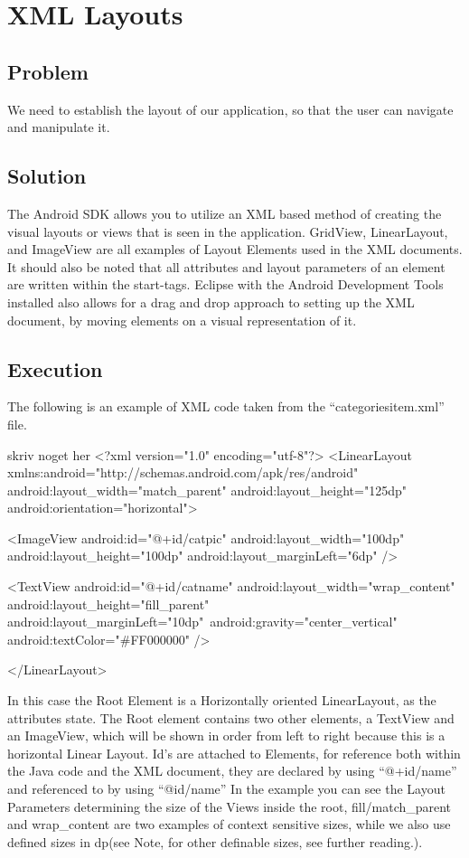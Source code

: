 \section{XML Layouts} %
\subsection*{Problem}
We need to establish the layout of our application, so that the user can navigate and manipulate it.
\subsection*{Solution}
The Android SDK allows you to utilize an XML based method of creating the visual layouts or views that is seen in the application.
GridView, LinearLayout, and ImageView are all examples of Layout Elements used in the XML documents.
It should also be noted that all attributes and layout parameters of an element are written within the start-tags.
Eclipse with the Android Development Tools installed also allows for a drag and drop approach to setting up the XML document, by moving elements on a visual representation of it.

\subsection*{Execution}
The following is an example of XML code taken from the ``categoriesitem.xml'' file.

\begin{xml}{skriv noget her}
<?xml version="1.0" encoding="utf-8"?>
<LinearLayout xmlns:android="http://schemas.android.com/apk/res/android"
    android:layout_width="match_parent"
    android:layout_height="125dp"
    android:orientation="horizontal">

    <ImageView
        android:id="@+id/catpic"
        android:layout_width="100dp"
        android:layout_height="100dp"
        android:layout_marginLeft="6dp" />

    <TextView
        android:id="@+id/catname"
        android:layout_width="wrap_content"
        android:layout_height="fill_parent"
        android:layout_marginLeft="10dp"\
        android:gravity="center_vertical"
        android:textColor="#FF000000" />

</LinearLayout>
\end{xml}

In this case the Root Element is a Horizontally oriented LinearLayout, as the attributes state.
The Root element contains two other elements, a TextView and an ImageView, which will be shown in order from left to right because this is a horizontal Linear Layout.
Id's are attached to Elements, for reference both within the Java code and the XML document, they are declared by using ``@+id/name'' and referenced to by using ``@id/name'' 
In the example you can see the Layout Parameters determining the size of the Views inside the root, fill/match\_parent and wrap\_content are two examples of context sensitive sizes, while we also use defined sizes in dp(see Note, for other definable sizes, see further reading.). \\

